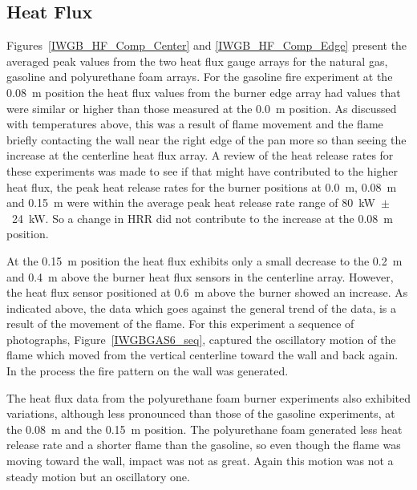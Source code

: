 \documentclass[twoside]{uocthesis}
\begin{document}
\subsection{Heat Flux}

Figures~\ref{IWGB_HF_Comp_Center} and \ref{IWGB_HF_Comp_Edge} present the averaged peak values from the two heat flux gauge arrays for the natural gas, gasoline and polyurethane foam arrays.  For the gasoline fire experiment at the 0.08~m position the heat flux values from the burner edge array had values that were similar or higher than those measured at the 0.0~m position. As discussed with temperatures above, this was a result of flame movement and the flame briefly contacting the wall near the right edge of the pan more so than seeing the increase at the centerline heat flux array.  A review of the heat release rates for these experiments was made to see if that might have contributed to the higher heat flux, the peak heat release rates for the burner positions at 0.0~m, 0.08~m and 0.15~m were within the average peak heat release rate range of 80~kW~$\pm$~24~kW.  So a change in HRR did not contribute to the increase at the 0.08~m position.  

At the 0.15~m position the heat flux exhibits only a small decrease to the 0.2~m and 0.4~m above the burner heat flux sensors in the centerline array.  However, the heat flux sensor positioned at 0.6~m above the burner showed an increase.  As indicated above, the data which goes against the general trend of the data, is a result of the movement of the flame.  For this experiment a sequence of photographs, Figure~\ref{IWGBGAS6_seq}, captured the oscillatory motion of the flame which moved from the vertical centerline toward the wall and back again.  In the process the fire pattern on the wall was generated.    

The heat flux data from the polyurethane foam burner experiments also exhibited variations, although less pronounced than those of the gasoline experiments, at the 0.08~m and the 0.15~m position.  The polyurethane foam generated less heat release rate and a shorter flame than the gasoline, so even though the flame was moving toward the wall, impact was not as great.  Again this motion was not a steady motion but an oscillatory one.      
\end{document}
